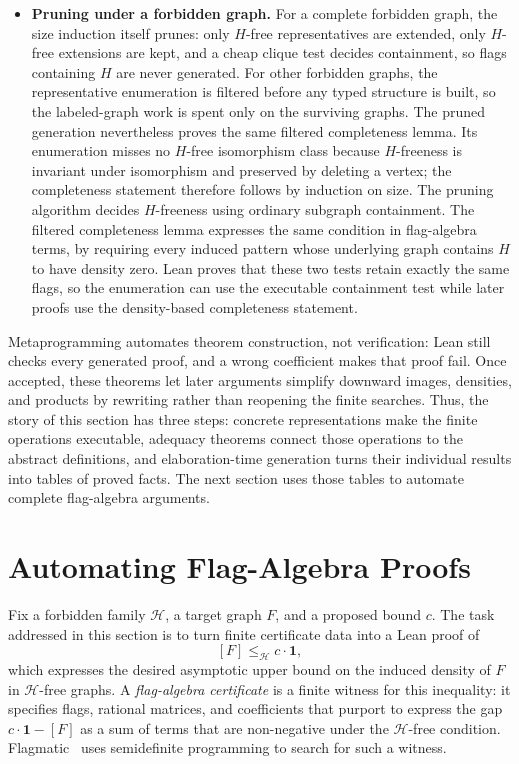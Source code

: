 \documentclass{article}
\begin{document}
\begin{itemize}
\item \textbf{Pruning under a forbidden graph.}
For a complete forbidden graph, the size induction itself prunes: only
\(H\)-free representatives are extended, only \(H\)-free extensions are kept,
and a cheap clique test decides containment, so flags containing \(H\) are
never generated.  For other forbidden graphs, the representative enumeration
is filtered before any typed structure is built, so the labeled-graph work is
spent only on the surviving graphs.  The pruned generation nevertheless
proves the same filtered completeness lemma.  Its enumeration misses no
\(H\)-free isomorphism class because \(H\)-freeness is invariant under
isomorphism and preserved by deleting a vertex; the completeness statement
therefore follows by induction on size.  The pruning algorithm
decides \(H\)-freeness using ordinary subgraph containment.  The filtered
completeness lemma expresses the same condition in flag-algebra terms, by
requiring every induced pattern whose underlying graph contains \(H\) to have
density zero.  Lean proves that these two tests retain exactly the same flags,
so the enumeration can use the executable containment test while later proofs
use the density-based completeness statement.

\end{itemize}

Metaprogramming automates theorem construction, not verification: Lean still
checks every generated proof, and a wrong coefficient makes that proof fail.
Once accepted, these theorems let later arguments simplify downward images,
densities, and products by rewriting rather than reopening the finite searches.
Thus, the story of this section has three steps: concrete representations make
the finite operations executable, adequacy theorems connect those operations
to the abstract definitions, and elaboration-time generation turns their
individual results into tables of proved facts.  The next section
uses those tables to automate complete flag-algebra arguments.

\section{Automating Flag-Algebra Proofs}
\label{sec:flagmatic}

Fix a forbidden family \(\mathcal H\), a target graph \(F\), and a proposed
bound \(c\).  The task addressed in this section is to turn finite certificate
data into a Lean proof of
\[
  [F]\leq_{\mathcal H}c\cdot\mathbf{1},
\]
which expresses the desired asymptotic upper bound on the induced density of
\(F\) in \(\mathcal H\)-free graphs.  A \emph{flag-algebra certificate} is a
finite witness for this inequality: it specifies flags, rational matrices, and
coefficients that purport to express the gap
\(c\cdot\mathbf{1}-[F]\) as a sum of terms that are non-negative under the
\(\mathcal H\)-free condition.  Flagmatic~\cite{vaughan2013flagmatic} uses
semidefinite programming to search for such a witness.
\end{document}
